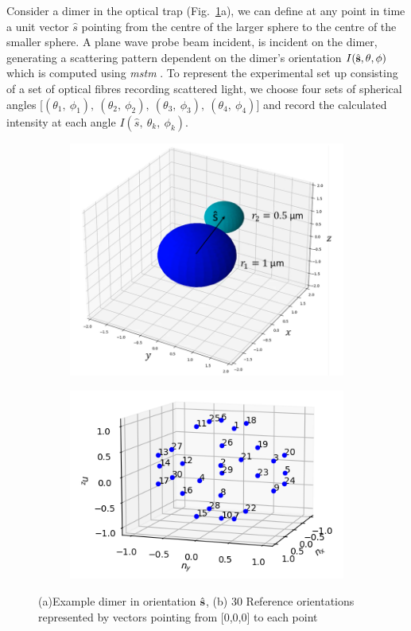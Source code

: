 Consider a dimer in the optical trap (Fig.~\ref{fig:dimer}a), 
we can define at any point in time a unit vector $\hat{s}$ 
pointing from the centre of the larger sphere to the centre 
of the smaller sphere. A plane wave probe beam incident, 
is incident on the dimer, generating a scattering pattern
dependent on the dimer's orientation $I(\hat{\bf s}, 
\theta, \phi)$ which is computed using \textit{mstm} 
\cite{I.Mishchenko1996}. To represent the experimental set 
up consisting of a set of optical fibres recording scattered 
light, we choose four sets of spherical angles [$(\theta_1,\ 
\phi_1), \ (\theta_2,\ \phi_2), \ (\theta_3, \ \phi_3), \ 
(\theta_4,\ \phi_4)$] and record the calculated intensity at 
each angle $I(\hat{s},\ \theta_k,\ \phi_k)$. 
\begin{figure}[h!]
	\centering
	\begin{subfigure}{0.49\textwidth}
		\subcaption{}
		\includegraphics[width=\textwidth]{fig2a.png}
	\end{subfigure}
	\begin{subfigure}{0.49\textwidth}
		\subcaption{}
		\includegraphics[width=\textwidth]{fig2b.png}
	\end{subfigure}
	\caption{(a)Example dimer in orientation $\hat{\bf s}$, (b) 30 Reference orientations represented by vectors pointing from [0,0,0] to each point}
	\label{fig:dimer}
\end{figure}

